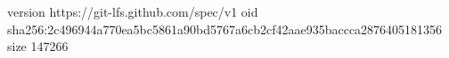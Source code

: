 version https://git-lfs.github.com/spec/v1
oid sha256:2c496944a770ea5bc5861a90bd5767a6cb2cf42aae935baccca2876405181356
size 147266
